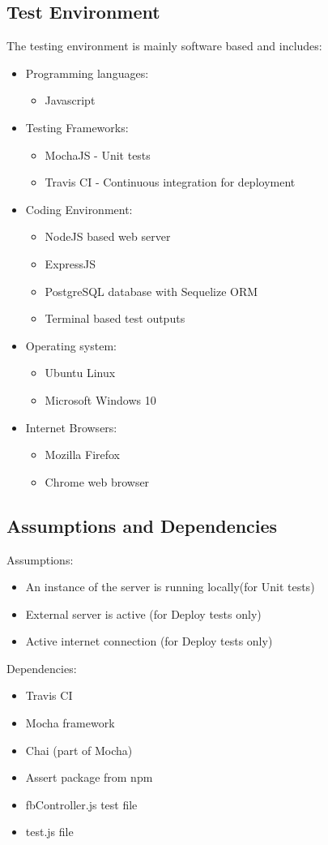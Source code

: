 \documentclass{article}
\begin{document}
\subsection{Test Environment}\label{subsec:testEnvironment}
The testing environment is mainly software based and includes:
\begin{itemize}
	\item Programming languages:
	\begin{itemize}
		\item Javascript 
	\end{itemize}
	\item Testing Frameworks:
	\begin{itemize}
		\item MochaJS - Unit tests
		\item Travis CI - Continuous integration for deployment
	\end{itemize}
	\item Coding Environment:
	\begin{itemize}
		\item NodeJS based web server
		\item ExpressJS
		\item PostgreSQL database with Sequelize ORM
		\item Terminal based test outputs
	\end{itemize}
	\item Operating system:
	\begin{itemize}
		\item Ubuntu Linux
		\item Microsoft Windows 10
	\end{itemize}
	\item Internet Browsers:
	\begin{itemize}
		\item Mozilla Firefox
		\item Chrome web browser
	\end{itemize}
\end{itemize}

\subsection{Assumptions and Dependencies}\label{subsec:assumptions}
Assumptions:
\begin{itemize}
	\item An instance of the server is running locally(for Unit tests)
	\item External server is active (for Deploy tests only)
	\item Active internet connection (for Deploy tests only)
\end{itemize}
Dependencies:
\begin{itemize}
	\item Travis CI 
	\item Mocha framework
	\item Chai (part of Mocha)
	\item Assert package from npm
	\item fbController.js test file
	\item test.js file
\end{itemize}
\end{document}
